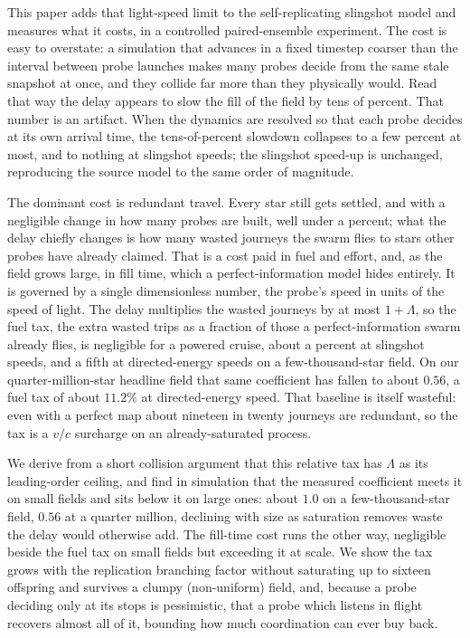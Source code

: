 This paper adds that light-speed limit to the self-replicating slingshot model and measures
what it costs, in a controlled paired-ensemble experiment. The cost is easy to overstate: a
simulation that advances in a fixed timestep coarser than the interval between probe launches makes
many probes decide from the same stale snapshot at once, and they collide far more than they
physically would. Read that way the delay appears to slow the fill of the field by tens of percent.
That number is an artifact. When the dynamics are resolved so that each probe decides at its own
arrival time, the tens-of-percent slowdown collapses to a few percent at most, and to nothing at
slingshot speeds; the slingshot speed-up is unchanged, reproducing the source model to the same
order of magnitude.

The dominant cost is redundant travel. Every star still gets settled, and with a negligible change
in how many probes are built, well under a percent; what the delay chiefly changes is how many
wasted journeys the swarm flies to stars other probes have already claimed. That is a cost paid in
fuel and effort, and, as the field grows large, in fill time, which a perfect-information model
hides entirely. It is governed by a single dimensionless number, the probe's speed in units of the
speed of light. The delay multiplies the wasted journeys by at most $1+\Lambda$, so the fuel tax,
the extra wasted trips as a fraction of those a perfect-information swarm already flies, is
negligible for a powered cruise, about a percent at slingshot speeds, and a fifth at directed-energy speeds on a
few-thousand-star field. On our quarter-million-star headline field that same coefficient has fallen
to about $0.56$, a fuel tax of about $11.2\%$ at directed-energy speed. That baseline is itself wasteful: even with a perfect map
about nineteen in twenty journeys are redundant, so the tax is a $v/c$ surcharge on an already-saturated
process.

We derive from a short collision argument that this relative tax has $\Lambda$ as its leading-order
ceiling, and find in simulation that the measured coefficient meets it on small fields and sits
below it on large ones: about $1.0$ on a
few-thousand-star field, $0.56$ at a quarter million, declining with size as saturation removes
waste the delay would otherwise add. The fill-time cost runs the other way, negligible beside the
fuel tax on small fields but exceeding it at scale. We show the tax grows with the replication
branching factor without saturating up to sixteen offspring and survives a clumpy (non-uniform)
field, and, because a probe deciding only at its stops is pessimistic, that a probe which listens in
flight recovers almost all of it, bounding how much coordination can ever buy back.
